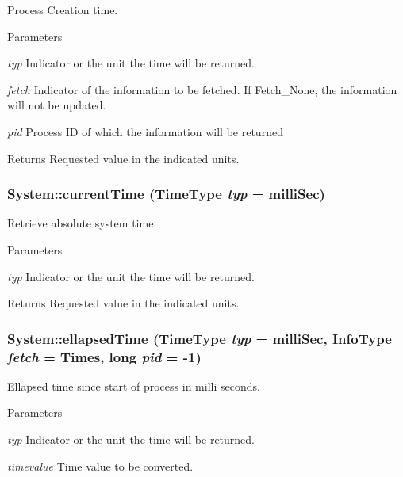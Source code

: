 \label{namespaceSystem_a90888edb3659d54b56e8c9744357202e}
Process Creation time. 
\begin{DoxyParams}{Parameters}
\item[{\em typ}]Indicator or the unit the time will be returned. \item[{\em fetch}]Indicator of the information to be fetched. If Fetch\_\-None, the information will not be updated. \item[{\em pid}]Process ID of which the information will be returned \end{DoxyParams}
\begin{DoxyReturn}{Returns}
Requested value in the indicated units. 
\end{DoxyReturn}
\hypertarget{namespaceSystem_ac41cf56db5c2f85828309490742a93d6}{
\subsubsection[{currentTime}]{ System::currentTime (TimeType {\em typ} = {\ttfamily milliSec})}}
\label{namespaceSystem_ac41cf56db5c2f85828309490742a93d6}
Retrieve absolute system time 
\begin{DoxyParams}{Parameters}
\item[{\em typ}]Indicator or the unit the time will be returned. \end{DoxyParams}
\begin{DoxyReturn}{Returns}
Requested value in the indicated units. 
\end{DoxyReturn}
\hypertarget{namespaceSystem_a98918aff92ea8947b8b5a3c48f0ab1fe}{
\subsubsection[{ellapsedTime}]{ System::ellapsedTime (TimeType {\em typ} = {\ttfamily milliSec}, \/  InfoType {\em fetch} = {\ttfamily Times}, \/  long {\em pid} = {\ttfamily -\/1})}}
\label{namespaceSystem_a98918aff92ea8947b8b5a3c48f0ab1fe}
Ellapsed time since start of process in milli seconds. 
\begin{DoxyParams}{Parameters}
\item[{\em typ}]Indicator or the unit the time will be returned. \item[{\em timevalue}]Time value to be converted. \end{DoxyParams}
